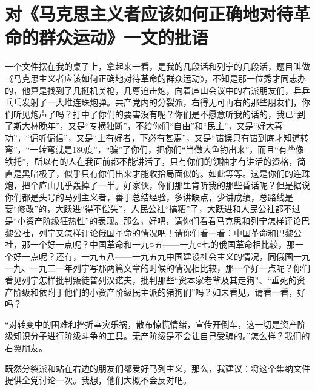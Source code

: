 \section[对《马克思主义者应该如何正确地对待革命的群众运动》一文的批语（一九五九年八月十五日）]{对《马克思主义者应该如何正确地对待革命的群众运动》一文的批语}


一个文件摆在我的桌子上，拿起来一看，是我的几段话和列宁的几段活，题目叫做《马克思主义者应该如何正确地对待革命的群众运动》，不知是那一位秀才同志办的，他算是找到了几挺机关枪，几尊迫击炮，向着庐山会议中的右派朋友们，乒乒乓乓发射了一大堆连珠炮弹。共产党内的分裂派，右得无可再右的那些朋友们，你们听见炮声了吗？打中了你们的要害没有呢？你们是不愿意听我的话的，我已“到了斯大林晚年”，又是“专横独断”，不给你们“自由”和“民主”，又是“好大喜功”，“偏听偏信”，又是“上有好者，下必有甚焉”，又是“错误只有错到底才知道转弯”，“一转弯就是180度”，“骗”了你们，把你们“当做大鱼钓出来”，而且“有些像铁托”，所以有的人在我面前都不能讲活了，只有你们的领袖才有讲活的资格，简直是黑暗极了，似乎只有你们出来才能收拾局面似的。如此等等。这是你们的连珠炮，把个庐山几乎轰掉了一半。好家伙，你们那里肯听我的那些昏话呢？但是据说你们都是头号的马列主义者，善于总结经验，多讲缺点，少讲成绩，总路线是要“修改”的，大跃进“得不偿失”，人民公社“搞糟”了，大跃进和人民公社都不过是“小资产阶级狂热性”的表现。那么，好吧，请你们看看马克思和列宁怎样评论巴黎公社，列宁又怎样评论俄国革命的情况吧！请你们看一看：中国革命和巴黎公社，那一个好一点呢？中国革命和一九○五——一九○七的俄国革命相比较，那一个好一点呢？还有，一九五八——一九五九中国建设社会主义的情况，同俄国一九一九、一九二一年列宁写那两篇文章的时候的情况相比较，那一个好一点呢？你们看见列宁怎样批判叛徒普列汉诺夫，批判那些“资本家老爷及其走狗”、“垂死的资产阶级和依附于他们的小资产阶级民主派的猪狗们”吗？如未看见，请看一看，好吗？

“对转变中的困难和挫折幸灾乐祸，散布惊慌情绪，宣传开倒车，这一切是资产阶级知识分子进行阶级斗争的工具。无产阶级是不会让自己受骗的。”怎么样？我们的右翼朋友。

既然分裂派和站在右边的朋友们都爱好马列主义，那么，我建议：将这个集纳文件提供全党讨论一次。我想，他们大概不会反对吧。


